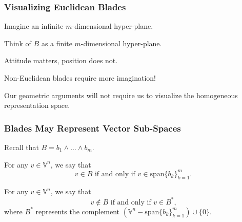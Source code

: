 \documentclass{beamer}
\newcommand{\V}{\mathbb{V}}
\begin{document}
\begin{frame}
\frametitle{Visualizing Euclidean Blades}
Imagine an \alert{infinite} $m$-dimensional hyper-plane.\pause

Think of $B$ as a \alert{finite} $m$-dimensional hyper-plane.\pause

\alert{Attitude} matters, \alert{position} does not.\pause

\alert{Non-Euclidean} blades require more imagination!\pause

Our geometric arguments will not require us to visualize the homogeneous representation space.
\end{frame}

\begin{frame}
\frametitle{Blades May Represent Vector Sub-Spaces}
Recall that $B = b_1\wedge\dots\wedge b_m$.\pause
\begin{definition}
For any $v\in\V^n$, we say that
\begin{equation*}
\mbox{$v\in B$ if and only if $v\in\mbox{span}\{b_k\}_{k=1}^m$}.
\end{equation*}
\end{definition}\pause
\begin{definition}
For any $v\in\V^n$, we say that
\begin{equation*}
\mbox{$v\not\in B$ if and only if $v\in B^*$,}
\end{equation*}
where $B^*$ represents the complement $(\V^n-\mbox{span}\{b_k\}_{k=1}^m)\cup\{0\}$.
\end{definition}
\end{frame}
\end{document}
